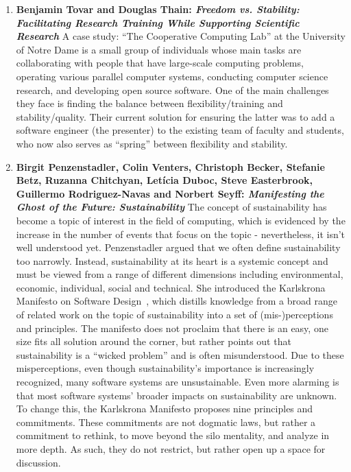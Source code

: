 \documentclass[11pt, oneside]{amsart}
\begin{document}
\begin{enumerate}
\item \textbf{Benjamin Tovar and Douglas Thain: \textit{Freedom vs. Stability:
Facilitating Research Training While Supporting Scientific Research}}
A case study: ``The Cooperative Computing Lab'' at the University of Notre Dame
is a small group of individuals whose main tasks are collaborating with
people that have large-scale computing problems, operating various parallel
computer systems, conducting computer science research, and developing open
source software. One of the main challenges they face is finding the balance
between flexibility/training and stability/quality. Their current solution for
ensuring the latter was to add a software engineer (the presenter) to the
existing team of faculty and students, who now also serves as ``spring''
between flexibility and stability.

\item \textbf{Birgit Penzenstadler, Colin Venters, Christoph Becker, Stefanie
Betz, Ruzanna Chitchyan, Let\'{i}cia Duboc, Steve Easterbrook, Guillermo
Rodriguez-Navas and Norbert Seyff: \textit{Manifesting the Ghost of the Future:
Sustainability}}
The concept of sustainability has become a topic of interest in the field of
computing, which is evidenced by the increase in the number of events that
focus on the topic - nevertheless, it isn't well understood yet. Penzenstadler
argued that we often define sustainability too narrowly. Instead,
sustainability at its heart is a systemic concept and must be viewed from a
range of different dimensions including environmental, economic, individual,
social and technical. She introduced the Karlskrona Manifesto on Software
Design~\cite{Becker:2014}, which distills knowledge from a broad range of related work on the
topic of sustainability into a set of (mis-)perceptions and principles. The
manifesto does not proclaim that there is an easy, one size fits all solution
around the corner, but rather points out that sustainability is a ``wicked
problem'' and is often misunderstood. Due to these misperceptions, even though
sustainability's importance is increasingly recognized, many software systems
are unsustainable. Even more alarming is that most software systems' broader
impacts on sustainability are unknown. To change this, the Karlskrona Manifesto
proposes nine principles and commitments. These commitments are not dogmatic
laws, but rather a commitment to rethink, to move beyond the silo mentality,
and analyze in more depth. As such, they do not restrict, but rather open up a
space for discussion.


\end{enumerate}
\end{document}
